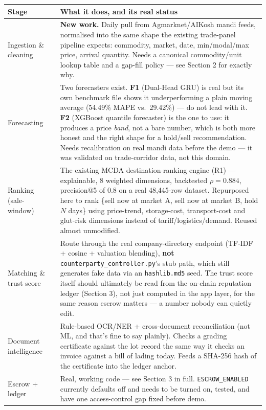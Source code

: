 \documentclass[11pt]{article}
\newcommand{\yes}{{\color{gxgreen}\ding{108}}}
\newcommand{\pmid}{{\color{gxcyan}\ding{109}}}
\newcommand{\bld}{{\color{gxamber}\ding{53}}}
\begin{document}
\renewcommand{\arraystretch}{1.35}
\noindent\begin{longtable}{@{}p{2.9cm}p{0.5cm}p{9.4cm}@{}}
\toprule
\textbf{Stage} & & \textbf{What it does, and its real status} \\
\midrule
\endhead
Ingestion \& cleaning & \bld & \textbf{New work.} Daily pull from Agmarknet/AIKosh mandi feeds, normalised
into the same shape the existing trade-panel pipeline expects: commodity, market, date, min/modal/max
price, arrival quantity. Needs a canonical commodity/unit lookup table and a gap-fill policy --- see
Section 2 for exactly why. \\[0.4em]
Forecasting & \pmid & Two forecasters exist. \textbf{F1} (Dual-Head GRU) is real but its own benchmark file
shows it underperforming a plain moving average (54.49\% MAPE vs.\ 29.42\%) --- do not lead with it.
\textbf{F2} (XGBoost quantile forecaster) is the one to use: it produces a price \emph{band}, not a bare
number, which is both more honest and the right shape for a hold/sell recommendation. Needs recalibration
on real mandi data before the demo --- it was validated on trade-corridor data, not this domain. \\[0.4em]
Ranking (sale-window) & \yes & The existing MCDA destination-ranking engine (R1) --- explainable, 8 weighted
dimensions, backtested $\rho = 0.884$, precision@5 of 0.8 on a real 48{,}445-row dataset. Repurposed here to
rank \{sell now at market A, sell now at market B, hold $N$ days\} using price-trend, storage-cost,
transport-cost and glut-risk dimensions instead of tariff/logistics/demand. Reused almost unmodified. \\[0.4em]
Matching \& trust score & \pmid & Route through the real company-directory endpoint (TF-IDF + cosine +
valuation blending), \textbf{not} \texttt{counterparty\_controller.py}'s stub path, which still generates
fake data via an \texttt{hashlib.md5} seed. The trust score itself should ultimately be read from the
on-chain reputation ledger (Section 3), not just computed in the app layer, for the same reason escrow
matters --- a number nobody can quietly edit. \\[0.4em]
Document intelligence & \yes & Rule-based OCR/NER + cross-document reconciliation (not ML, and that's fine
to say plainly). Checks a grading certificate against the lot record the same way it checks an invoice
against a bill of lading today. Feeds a SHA-256 hash of the certificate into the ledger anchor. \\[0.4em]
Escrow + ledger & \pmid & Real, working code --- see Section 3 in full. \texttt{ESCROW\_ENABLED} currently
defaults off and needs to be turned on, tested, and have one access-control gap fixed before demo. \\
\bottomrule
\end{longtable}
\end{document}
